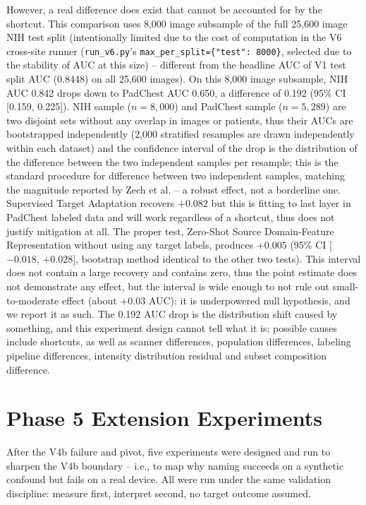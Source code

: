 \documentclass{ieeeaccess}
\begin{document}
However, a real difference does exist that cannot be accounted for by the
shortcut. This comparison uses 8,000 image subsample of the full 25,600 image
NIH test split (intentionally limited due to the cost of computation in
the V6 cross-site runner (\texttt{run\_v6.py}'s \texttt{max\_per\_split=\{"test":
8000\}}, selected due to the stability of AUC at this size) – different from
the headline AUC of V1 test split AUC (0.8448) on all 25,600 images). On
this 8,000 image subsample, NIH AUC 0.842 drops down to PadChest AUC 0.650,
a difference of 0.192 (95\% CI [0.159, 0.225]). NIH sample ($n=8,000$)
and PadChest sample ($n=5,289$) are two disjoint sets without any overlap in
images or patients, thus their AUCs are bootstrapped independently (2,000
stratified resamples are drawn independently within each dataset) and the
confidence interval of the drop is the distribution of the difference between
the two independent samples per resample; this is the standard procedure for  difference between two independent samples, matching the magnitude
reported by Zech et al. -- a robust effect, not a borderline one. Supervised
Target Adaptation recovers $+0.082$  but this is fitting to last layer in
PadChest labeled data and will work regardless of a shortcut, thus does not
justify mitigation at all. The proper test, Zero-Shot Source Domain-Feature
Representation without using any target labels, produces $+0.005$ (95\% CI
[$-0.018$, $+0.028$], bootstrap method identical to the other two tests).
This interval does not contain a large recovery and contains zero, thus the
point estimate does not demonstrate any effect, but the interval is wide
enough to not rule out small-to-moderate effect (about $+0.03$ AUC): it is
underpowered null hypothesis, and we report it as such. The 0.192 AUC drop is
the distribution shift caused by something, and this experiment design cannot
tell what it is; possible causes include shortcuts, as well as scanner
differences, population differences, labeling pipeline differences, intensity
distribution residual and subset composition difference.

\section{Phase 5 Extension Experiments}
\label{sec:phase5}
After the V4b failure and pivot, five experiments were designed and run to
sharpen the V4b boundary -- i.e., to map why naming succeeds on a synthetic
confound but fails on a real device. All were run under the same validation
discipline: measure first, interpret second, no target outcome assumed.
\end{document}
